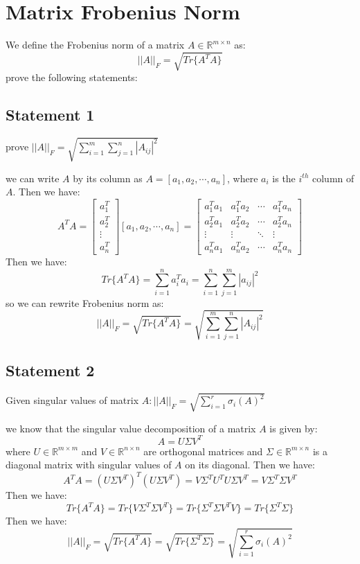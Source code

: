 \section{Matrix Frobenius Norm}
We define the Frobenius norm of a matrix $A \in \mathbb{R}^{m \times n}$ as:
$$||A||_F = \sqrt{Tr\{A^T A\}}$$
prove the following statements:
\subsection{Statement 1}
prove $||A||_F = \sqrt{\sum_{i=1}^{m} \sum_{j=1}^{n} |A_{ij}|^2}$
\begin{qsolve}
	\begin{qsolve}[]
		we can write $A$ by its column as $A = [a_1, a_2, \cdots, a_n]$, where $a_i$ is the $i^{th}$ column of $A$. Then we have:
		$$A^T A = \begin{bmatrix} a_1^T \\ a_2^T \\ \vdots \\ a_n^T \end{bmatrix} [a_1, a_2, \cdots, a_n] = \begin{bmatrix} a_1^T a_1 & a_1^T a_2 & \cdots & a_1^T a_n \\ a_2^T a_1 & a_2^T a_2 & \cdots & a_2^T a_n \\ \vdots & \vdots & \ddots & \vdots \\ a_n^T a_1 & a_n^T a_2 & \cdots & a_n^T a_n \end{bmatrix}$$
		Then we have:
		$$Tr\{A^T A\} = \sum_{i=1}^{n} a_i^T a_i = \sum_{i=1}^{n} \sum_{j=1}^{m} |a_{ij}|^2$$
		so we can rewrite Frobenius norm as:
		$$||A||_F = \sqrt{Tr\{A^T A\}} = \sqrt{\sum_{i=1}^{m} \sum_{j=1}^{n} |A_{ij}|^2}$$
	\end{qsolve}
\end{qsolve}
\subsection{Statement 2}
Given singular values of matrix $A : ||A||_F = \sqrt{\sum_{i=1}^{r} \sigma_i(A)^2}$
\begin{qsolve}
	\begin{qsolve}[]
		we know that the singular value decomposition of a matrix $A$ is given by:
		$$A = U \Sigma V^T$$
		where $U \in \mathbb{R}^{m \times m}$ and $V \in \mathbb{R}^{n \times n}$ are orthogonal matrices and $\Sigma \in \mathbb{R}^{m \times n}$ is a diagonal matrix with singular values of $A$ on its diagonal. Then we have:
		$$A^T A = (U \Sigma V^T)^T (U \Sigma V^T) = V \Sigma^T U^T U \Sigma V^T = V \Sigma^T \Sigma V^T$$
		\splitqsolve[\splitqsolve]
		Then we have:
		$$Tr\{A^T A\} = Tr\{V \Sigma^T \Sigma V^T\} = Tr\{\Sigma^T \Sigma V^T V\} = Tr\{\Sigma^T \Sigma\}$$
		Then we have:
		$$||A||_F = \sqrt{Tr\{A^T A\}} = \sqrt{Tr\{\Sigma^T \Sigma\}} = \sqrt{\sum_{i=1}^{r} \sigma_i(A)^2}$$
	\end{qsolve}
\end{qsolve}
